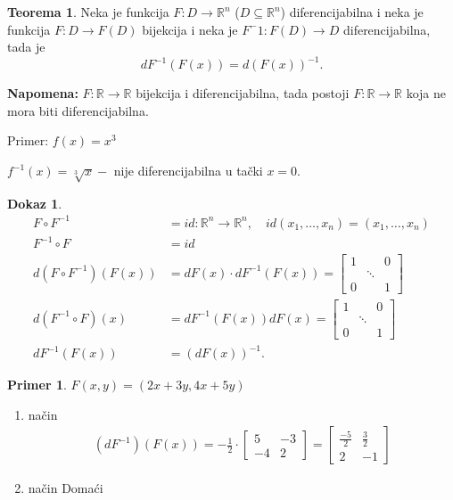 \documentclass[11pt]{article}
\newcommand{\real}{\mathbb{R}}
\theoremstyle{definition}
\newtheorem{primer}[definicija]{Primer}
\newtheorem{teorema}[definicija]{Teorema}
\theoremstyle{serbnodot}
\newtheorem*{dokaz}{Dokaz}
\newcommand{\napomena}[1]{%
    \textbf{Napomena:} #1
}
\begin{document}
\begin{teorema}
    Neka je funkcija \(F: D \to \real ^n\) (\(D \subseteq \real^n\)) diferencijabilna
    i neka je funkcija \(F : D \to F(D)\) bijekcija i neka je
    \(F^-1: F(D) \to D\) diferencijabilna, tada je
    \[
        dF^{-1} (F(x)) = d(F(x))^{-1}.
    \]
\end{teorema}
\napomena{\(F: \real \to \real \) bijekcija i diferencijabilna, tada postoji
\(F: \real \to \real \) koja ne mora biti diferencijabilna.

Primer: \(f(x) = x^3\)

\(f^{-1}(x) = \sqrt[3]{x} - \) nije diferencijabilna u tački \(x = 0\).}
\begin{dokaz}
    \begin{align*}
        F \circ F^{-1} &= id: \real^n \to \real^n, \quad id(x_1, \dots, x_n) = (x_1, \dots, x_n) \\
        F^{-1} \circ F &= id \\
        d(F \circ F^{-1})(F(x)) &= dF(x) \cdot dF^{-1}(F(x)) =
        \begin{bmatrix}
            1 &  & 0 \\
            &\ddots & \\
            0 &  & 1 
        \end{bmatrix} \\
        d(F^{-1}\circ F)(x) &= dF^{-1}(F(x))dF(x) = 
        \begin{bmatrix}
            1 &  & 0 \\
            &\ddots & \\
            0 &  & 1 
        \end{bmatrix} \\
        dF^{-1}(F(x)) &= (dF(x))^{-1}.
    \end{align*}
\end{dokaz}

\begin{primer}
\(F(x,y) = (2x+3y,4x+5y)\)
\begin{enumerate}[label = \Roman*]
    \item način
    \begin{align*}
        (dF^{-1})(F(x)) = -\frac{1}{2} \cdot 
        \begin{bmatrix}
            5 & -3 \\ -4 & 2
        \end{bmatrix} =
        \begin{bmatrix}
            \frac{-5}{2} & \frac{3}{2} \\ 2 & -1   
        \end{bmatrix}
    \end{align*}
    \item način Domaći
\end{enumerate}
\end{primer}
\end{document}
